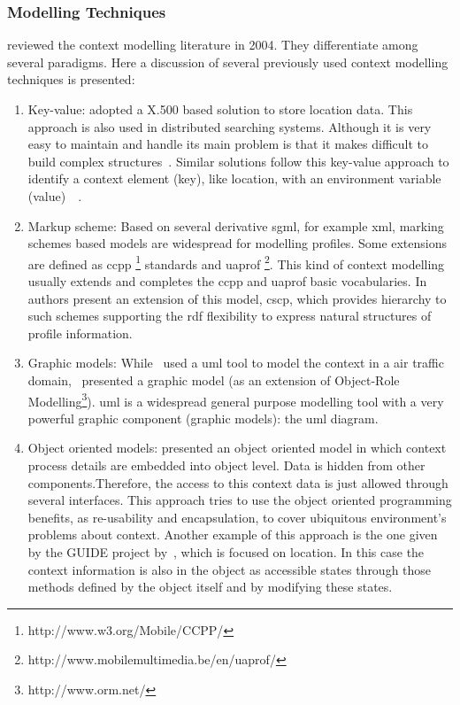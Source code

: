 
\subsubsection{Modelling Techniques}
\label{sec:modelling_techniques}

\citet{strang_context_2004} reviewed the context modelling literature in 2004.
They differentiate among several paradigms. Here a discussion of several 
previously used context modelling techniques is presented:

\begin{enumerate}
  \item Key-value: \citet{maass_location_aware_1998} adopted a X.500 based 
  solution to store location data. This approach is also used in distributed 
  searching systems. Although it is very easy to maintain and handle its main 
  problem is that it makes difficult to build complex structures~\citep{strang_context_2004}. 
  Similar solutions follow this key-value approach to identify a context element 
  (key), like location, with an environment variable (value)~\citep{schilit_customizing_1993}~\citep{voelker_mobisaic_1996}. 
  
  \item Markup scheme: Based on several derivative \ac{sgml}, for example 
  \ac{xml}, marking schemes based models are widespread for modelling profiles. 
  Some extensions are defined as \ac{ccpp} \footnote{http://www.w3.org/Mobile/CCPP/} 
  standards and \ac{uaprof} \footnote{http://www.mobilemultimedia.be/en/uaprof/}. 
  This kind of context modelling usually extends and completes the \ac{ccpp} and 
  \ac{uaprof} basic vocabularies. In~\citep{held_modeling_2002} authors present 
  an extension of this model, \ac{cscp}, which provides hierarchy to such schemes 
  supporting the \ac{rdf} flexibility to express natural structures of profile 
  information.
  
  \item Graphic models: While~\citet{bauer_identification_2003} used a \ac{uml} 
  tool to model the context in a air traffic domain,~\citet{henricksen_generating_2003} 
  presented a graphic model (as an extension of Object-Role Modelling\footnote{http://www.orm.net/}). 
  \ac{uml} is a widespread general purpose modelling tool with a very powerful 
  graphic component (graphic models): the \ac{uml} diagram. 
  
  \item Object oriented models: \citet{strang_context_2004} presented an object 
  oriented model in which context process details are embedded into object level. 
  Data is hidden from other components.Therefore, the access to this context data 
  is just allowed through several interfaces. This approach tries to use the 
  object oriented programming benefits, as re-usability and encapsulation, to 
  cover ubiquitous environment's problems about context. Another example of this 
  approach is the one given by the GUIDE project by~\citet{cheverst_design_1999}, 
  which is focused on location. In this case the context information is also in 
  the object as accessible states through those methods defined by the object 
  itself and by modifying these states.
  

\end{enumerate}
